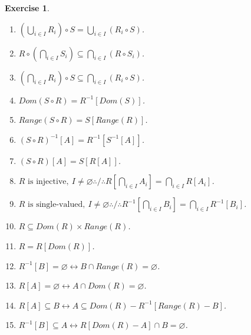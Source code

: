\documentclass[10pt,a4paper]{book}
\newtheorem{exercise}{Exercise}[section]
\begin{document}
\begin{exercise}
\begin{enumerate}
        \item $\left(\bigcup_{i\in I}R_i\right)\circ S
                  =\bigcup_{i\in I}(R_i\circ S)$.

        \item $R\circ\left(\bigcap_{i\in I}S_i\right)
                  \subseteq\bigcap_{i\in I}(R\circ S_i)$.

        \item $\left(\bigcap_{i\in I}R_i\right)\circ S
                  \subseteq\bigcap_{i\in I}(R_i\circ S)$.

        \item $Dom(S\circ R)=R^{-1}[Dom(S)]$.

        \item $Range(S\circ R)=S[Range(R)]$.

        \item $(S\circ R)^{-1}[A]
                  =R^{-1}[S^{-1}[A]]$.

        \item $(S\circ R)[A]=S[R[A]]$.

        \item $R\text{ is injective},\ I\neq\varnothing
                  \therefore / \therefore
                  R\left[\bigcap_{i\in I}A_i\right]
                  =\bigcap_{i\in I}R[A_i]$.

        \item $R\text{ is single-valued},\ I\neq\varnothing
                  \therefore / \therefore
                  R^{-1}\left[\bigcap_{i\in I}B_i\right]
                  =\bigcap_{i\in I}R^{-1}[B_i]$.

        \item $R\subseteq Dom(R)\times Range(R)$.

        \item $R=R[Dom(R)]$.

        \item $R^{-1}[B]=\varnothing
                  \leftrightarrow B\cap Range(R)=\varnothing$.

        \item $R[A]=\varnothing
                  \leftrightarrow A\cap Dom(R)=\varnothing$.

        \item $R[A]\subseteq B
                  \leftrightarrow A\subseteq
                  Dom(R)-R^{-1}[Range(R)-B]$.

        \item $R^{-1}[B]\subseteq A
                  \leftrightarrow
                  R[Dom(R)-A]\cap B=\varnothing$.
    \end{enumerate}



\end{exercise}
\end{document}
